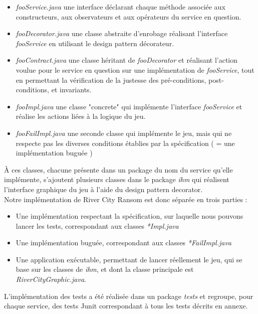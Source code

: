 \documentclass[a4paper, 11pt, notitlepage]{article}
\begin{document}
\begin{itemize}
\item \emph{fooService.java}  une interface déclarant chaque méthode associée aux constructeurs, aux observateurs et aux opérateurs du service en question.  \\
\item \emph{fooDecorator.java}  une classe abstraite d'enrobage réalisant l'interface \emph{fooService} en utilisant le design pattern décorateur.\\
\item \emph{fooContract.java}  une classe héritant de \emph{fooDecorator} et réalisant l'action voulue pour le service en question sur une implémentation de \emph{fooService}, tout en permettant la vérification de la justesse des pré-conditions, post-conditions, et invariants.  \\
\item \emph{fooImpl.java}  une classe "concrete" qui implémente l'interface \emph{fooService} et réalise les actions liées à la logique du jeu. \\
\item \emph{fooFailImpl.java}  une seconde classe qui implémente le jeu, mais qui ne respecte pas les diverses conditions établies par la spécification ( = une implémentation buguée ) \\
\end{itemize}

À ces classes, chacune présente dans un package du nom du service qu'elle implémente, s'ajoutent plusieurs classes dans le package \emph{ihm} qui réalisent l'interface graphique du jeu à l'aide du design pattern decorator. \\

Notre implémentation de River City Ransom est donc séparée en trois parties : 
\begin{itemize}
\item Une implémentation respectant la spécification, sur laquelle nous pouvons lancer les tests, correspondant aux classes \emph{*Impl.java}
\item Une implémentation buguée, correspondant aux classes \emph{*FailImpl.java}
\item Une application exécutable, permettant de lancer réellement le jeu, qui se base sur les classes de \emph{ihm}, et dont la classe principale est \emph{RiverCityGraphic.java}. \\
\end{itemize}

L'implémentation des tests a été réalisée dans un package \emph{tests} et regroupe, pour chaque service, des tests Junit correspondant à tous les tests décrits en annexe.
\end{document}
